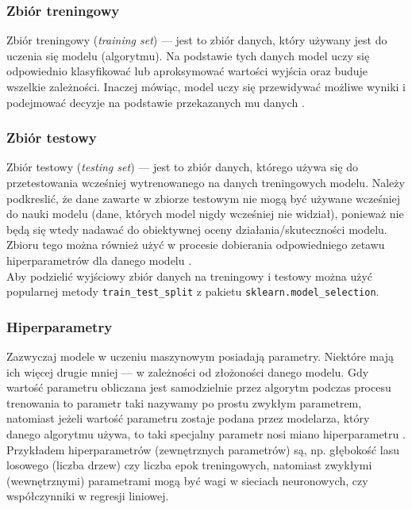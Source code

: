 \subsubsection{Zbiór treningowy}
Zbiór treningowy (\textit{training set}) --- jest to zbiór danych, który używany jest do uczenia się modelu (algorytmu). Na podstawie tych danych model uczy się odpowiednio klasyfikować lub aproksymować wartości wyjścia oraz buduje wszelkie zależności. Inaczej mówiąc, model uczy się przewidywać możliwe wyniki i podejmować decyzje na podstawie przekazanych mu danych \cite{geron}.
\subsubsection{Zbiór testowy}
Zbiór testowy (\textit{testing set}) --- jest to zbiór danych, którego używa się do przetestowania wcześniej wytrenowanego na danych treningowych modelu. Należy podkreslić, że dane zawarte w zbiorze testowym nie mogą być używane wcześniej do nauki modelu (dane, których model nigdy wcześniej nie widział), ponieważ nie będą się wtedy nadawać do obiektywnej oceny działania/skuteczności modelu. Zbioru tego można również użyć w procesie dobierania odpowiedniego zetawu hiperparametrów dla danego modelu \cite{raschka}. \\

\noindent Aby podzielić wyjściowy zbiór danych na treningowy i testowy można użyć popularnej metody \verb|train_test_split| z pakietu \verb|sklearn.model_selection|.


\subsubsection{Hiperparametry}
Zazwyczaj modele w uczeniu maszynowym posiadają parametry. Niektóre mają ich więcej drugie mniej --- w zależności od złożoności danego modelu. Gdy wartość parametru obliczana jest samodzielnie przez algorytm podczas procesu trenowania to parametr taki nazywamy po prostu zwykłym parametrem, natomiast jeżeli wartość parametru zostaje podana przez modelarza, który danego algorytmu używa, to taki specjalny parametr nosi miano hiperparametru \cite{mamczur}. Przykładem hiperparametrów (zewnętrznych parametrów) są, np. głębokość lasu losowego (liczba drzew) czy liczba epok treningowych, natomiast zwykłymi (wewnętrznymi) parametrami mogą być wagi w sieciach neuronowych, czy współczynniki w regresji liniowej.



